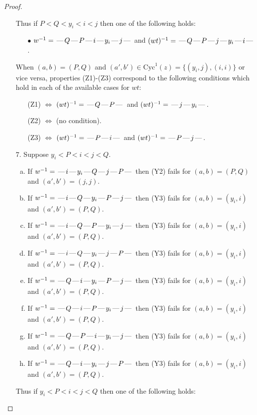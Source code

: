 \documentclass[10pt]{article}
\theoremstyle{definition}
\theoremstyle{definition}
\def\dash{\text{\hspace{0.5mm}---\hspace{0.5mm}}}
\def\Cyc{\mathrm{Cyc}}
\begin{document}
\begin{proof}
\begin{enumerate}
Thus if $P < Q < y_i < i < j$ then one of the following holds:
\begin{enumerate}
\item[$\bullet$] $w^{-1} = \dash Q\dash P\dash i\dash y_i\dash j\dash $ and $(wt)^{-1} = \dash Q\dash P\dash j\dash y_i\dash i\dash $.
\end{enumerate}
When $(a,b)= (P,Q)$ and $(a',b')\in \Cyc^1(z)=\{(y_i,j),(i,i)\}$ or vice versa,
properties (Z1)-(Z3) correspond to the following conditions which
hold in each of the available cases for $wt$:
\begin{enumerate}
\item[](Z1) $\Leftrightarrow$ $(wt)^{-1} = \dash Q \dash P \dash$  and $(wt)^{-1} = \dash j \dash y_i \dash$.
\item[](Z2) $\Leftrightarrow$ (no condition).
\item[](Z3) $\Leftrightarrow$ $(wt)^{-1} = \dash P \dash i \dash$  and $(wt)^{-1} = \dash P \dash j \dash$.
\end{enumerate}
\item[$7$.] Suppose $y_i < P < i < j < Q$.
\begin{enumerate}[(a)]
\item If $w^{-1} = \dash i\dash y_i\dash Q\dash j\dash P\dash $ then (Y2) fails for $(a,b)=(P,Q)$ and $(a',b')=(j,j)$.
\item If $w^{-1} = \dash i\dash Q\dash y_i\dash P\dash j\dash $ then (Y3) fails for $(a,b)=(y_i,i)$ and $(a',b')=(P,Q)$.
\item If $w^{-1} = \dash i\dash Q\dash P\dash y_i\dash j\dash $ then (Y3) fails for $(a,b)=(y_i,i)$ and $(a',b')=(P,Q)$.
\item If $w^{-1} = \dash i\dash Q\dash y_i\dash j\dash P\dash $ then (Y3) fails for $(a,b)=(y_i,i)$ and $(a',b')=(P,Q)$.
\item If $w^{-1} = \dash Q\dash i\dash y_i\dash P\dash j\dash $ then (Y3) fails for $(a,b)=(y_i,i)$ and $(a',b')=(P,Q)$.
\item If $w^{-1} = \dash Q\dash i\dash P\dash y_i\dash j\dash $ then (Y3) fails for $(a,b)=(y_i,i)$ and $(a',b')=(P,Q)$.
\item If $w^{-1} = \dash Q\dash P\dash i\dash y_i\dash j\dash $ then (Y3) fails for $(a,b)=(y_i,i)$ and $(a',b')=(P,Q)$.
\item If $w^{-1} = \dash Q\dash i\dash y_i\dash j\dash P\dash $ then (Y3) fails for $(a,b)=(y_i,i)$ and $(a',b')=(P,Q)$.
\end{enumerate}
Thus if $y_i < P < i < j < Q$ then one of the following holds:
\begin{enumerate}

\end{enumerate}
\end{enumerate}
\end{proof}
\end{document}

